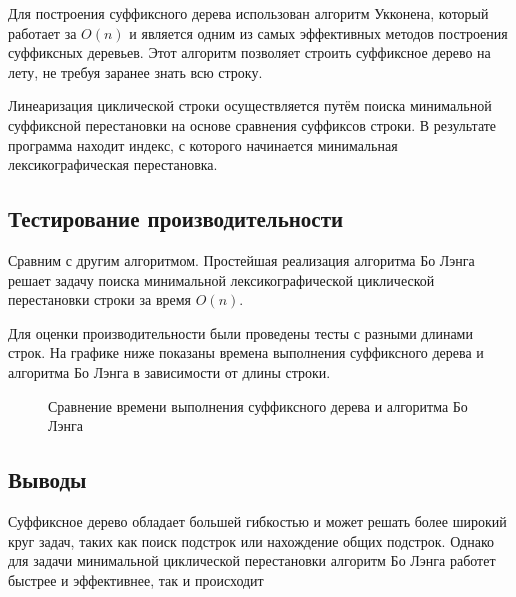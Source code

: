 \documentclass[12pt]{article}
\begin{document}
Для построения суффиксного дерева использован алгоритм Укконена, который работает за $O(n)$ и является одним из самых эффективных методов построения суффиксных деревьев. Этот алгоритм позволяет строить суффиксное дерево на лету, не требуя заранее знать всю строку.

Линеаризация циклической строки осуществляется путём поиска минимальной суффиксной перестановки на основе сравнения суффиксов строки. В результате программа находит индекс, с которого начинается минимальная лексикографическая перестановка.


\subsection*{Тестирование производительности}
Сравним с другим алгоритмом. Простейшая реализация алгоритма Бо Лэнга решает задачу поиска минимальной лексикографической циклической перестановки строки за время $O(n)$.

Для оценки производительности были проведены тесты с разными длинами строк. На графике ниже показаны времена выполнения суффиксного дерева и алгоритма Бо Лэнга в зависимости от длины строки.

\begin{figure}[htbp]
    \centering
    \caption{Сравнение времени выполнения суффиксного дерева и алгоритма Бо Лэнга}
\end{figure}


\newpage
\subsection*{Выводы}

Суффиксное дерево обладает большей гибкостью и может решать более широкий круг задач, таких как поиск подстрок или нахождение общих подстрок. Однако для задачи минимальной циклической перестановки алгоритм Бо Лэнга работет быстрее и эффективнее, так и происходит
\end{document}
